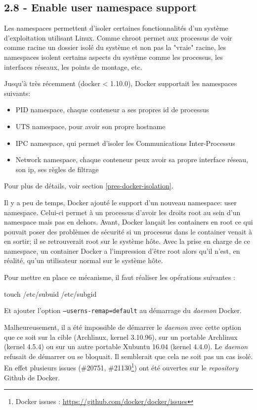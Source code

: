 \documentclass[11pt,a4paper,oneside]{report}
\newcommand{\code}[1]{\texttt{#1}}
\begin{document}
\subsection{2.8 - Enable user namespace support}
Les namespaces permettent d'isoler certaines fonctionnalités d'un système d'exploitation utilisant Linux. Comme chroot permet aux processus de voir comme racine un dossier isolé du système et non pas la "vraie" racine, les namespaces isolent certains aspects du système comme les processus, les interfaces réseaux, les points de montage, etc.

Jusqu'à très récemment (docker < 1.10.0), Docker supportait les namespaces suivants:
\begin{itemize}
\item PID namespace, chaque conteneur a ses propres id de processus
\item UTS namespace, pour avoir son propre hostname
\item IPC namespace, qui permet d'isoler les Communications Inter-Processus
\item Network namespace, chaque conteneur peux avoir sa propre interface réseau, son ip, ses règles de filtrage
\end{itemize}

Pour plus de détails, voir section \ref{pres-docker-isolation}.

Il y a peu de temps, Docker ajouté le support d'un nouveau namespace\cite{docker_1_10_user_namespace}: user namespace. Celui-ci permet à un processus d'avoir les droits root au sein d'un namespace mais pas en dehors. Avant, Docker lançait les containers en root ce qui pouvait poser des problèmes de sécurité si un processus dans le container venait à en sortir; il se retrouverait root sur le système hôte. Avec la prise en charge de ce namespace, un container Docker a l'impression d'être root alors qu'il n'est, en réalité, qu'un utilisateur normal sur le système hôte.

Pour mettre en place ce mécanisme, il faut réaliser les opérations suivantes :

\begin{bashcode}
touch /etc/subuid /etc/subgid
\end{bashcode}

Et ajouter l'option \code{--userns-remap=default} au démarrage du \textit{daemon} Docker.

Malheureusement, il a été impossible de démarrer le \textit{daemon} avec cette option que ce soit sur la cible (Archlinux, kernel 3.10.96), sur un portable Archlinux (kernel 4.5.4) ou sur un autre portable Xubuntu 16.04 (kernel 4.4.0). Le \textit{daemon} refusait de démarrer ou se bloquait. Il semblerait que cela ne soit pas un cas isolé. En effet plusieurs issues (\#20751, \#21130\footnote{Docker issues : \url{https://github.com/docker/docker/issues}}) ont été ouvertes sur le \textit{repository} Github de Docker.
\end{document}
